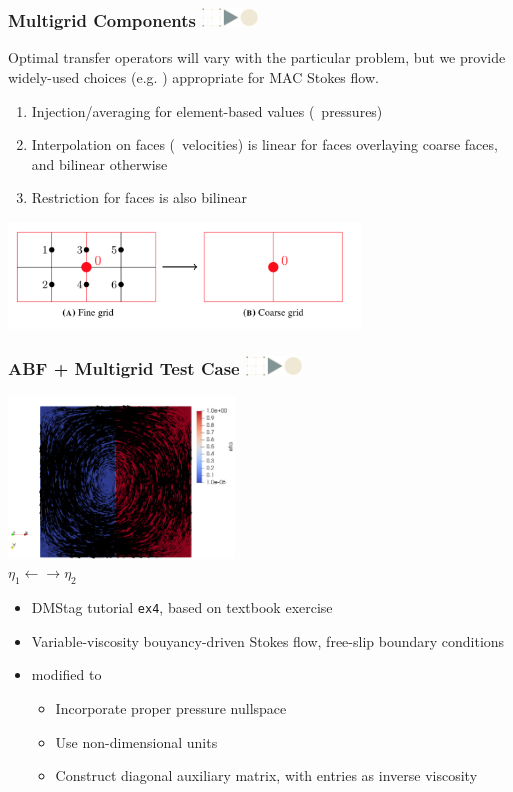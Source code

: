 \documentclass{beamer}
\newcommand\frametitlelogo[1]{\frametitle{#1\hspace{0pt plus 1 filll} \includegraphics[width=42pt]{logo_slides}}}
\begin{document}
\begin{frame}[fragile]
  \frametitlelogo{Multigrid Components}

  Optimal transfer operators will vary with the particular problem,
  but we provide widely-used choices (e.g. )
  appropriate for MAC Stokes flow.

  \begin{enumerate}
    \item  Injection/averaging for element-based values (~pressures)
    \item  Interpolation on faces (~velocities) is linear for faces overlaying coarse faces, and bilinear otherwise
    \item Restriction for faces is also bilinear
  \end{enumerate}
  \begin{center}
  \includegraphics[width=0.7\textwidth]{images/Chen2018restrict.png} 
  \end{center}

\end{frame}

\begin{frame}[fragile]
\frametitlelogo{ABF + Multigrid Test Case}
\begin{center}
\includegraphics[width=0.45\textwidth]{images/ex4_1e6.png}\\
$ \eta_1 \leftarrow \rightarrow \eta_2$
\end{center}
\begin{itemize}
\item DMStag tutorial \texttt{ex4}, based on textbook exercise 
\item Variable-viscosity bouyancy-driven Stokes flow, free-slip boundary conditions
\item modified to
\begin{itemize}
\item Incorporate proper pressure nullspace
\item Use non-dimensional units
\item Construct diagonal auxiliary matrix, with entries as inverse viscosity
\end{itemize}
\end{itemize}
\end{frame}
\end{document}
